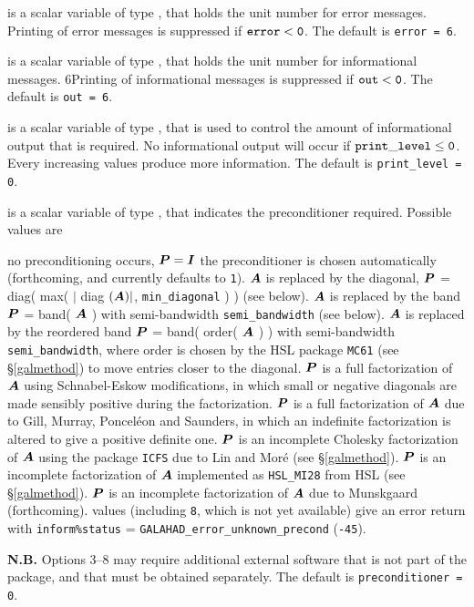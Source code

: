 \documentclass{galahad}
\begin{document}
\begin{description}

 is a scalar variable of type \integer, that holds the
unit number for error messages.
Printing of error messages is suppressed if ${\tt error} < {\tt 0}$.
The default is {\tt error = 6}.

 is a scalar variable of type \integer, that holds the
unit number for informational messages.
6Printing of informational messages is suppressed if ${\tt out} < {\tt 0}$.
The default is {\tt out = 6}.

 is a scalar variable of type \integer,
that is used
to control the amount of informational output that is required. No
informational output will occur if ${\tt print\_level} \leq {\tt 0}$. 
Every increasing values produce more information.
The default is {\tt print\_level = 0}.

 is a scalar variable of type \integer, that 
indicates the preconditioner required. Possible values are
\begin{description}
 no preconditioning occurs, ${\bm{P}} = {\bm{I}}$
  the preconditioner is chosen automatically (forthcoming,
         and currently defaults to {\tt 1}).
  ${\bm{A}}$ is replaced by the diagonal, 
         ${\bm{P}}$ = diag( max( $|$ diag $({\bm{A}})|$, {\tt min\_diagonal} ) ) (see below).
  ${\bm{A}}$ is replaced by the band 
         ${\bm{P}}$ = band( ${\bm{A}}$ ) with semi-bandwidth {\tt semi\_bandwidth}
         (see below).
  ${\bm{A}}$ is replaced by the reordered band 
         ${\bm{P}}$ = band( order( ${\bm{A}}$ ) ) with semi-bandwidth 
         {\tt semi\_bandwidth}, where order is chosen by the HSL package
         {\tt MC61} (see \S\ref{galmethod}) to move entries closer to 
         the diagonal.
  ${\bm{P}}$ is a full factorization of ${\bm{A}}$ using Schnabel-Eskow 
         modifications, in which small or negative diagonals are
         made sensibly positive during the factorization.
  ${\bm{P}}$ is a full factorization of ${\bm{A}}$  due to Gill, Murray, 
         Poncel\'{e}on and Saunders, in which an indefinite factorization 
         is altered to give a positive definite one.
  ${\bm{P}}$ is an incomplete Cholesky factorization of ${\bm{A}}$ using the 
         package {\tt ICFS} due to Lin and Mor\'{e} (see \S\ref{galmethod}).
  ${\bm{P}}$ is an incomplete factorization of ${\bm{A}}$ implemented 
         as {\tt HSL\_MI28} from HSL (see \S\ref{galmethod}).
  ${\bm{P}}$ is an incomplete factorization of ${\bm{A}}$ due 
         to Munskgaard (forthcoming).
 values (including {\tt 8}, which is not yet available) give
         an error return with {\tt inform\%status} =
         {\tt GALAHAD\_error\_unknown\_precond} ({\tt -45}).
\end{description}
{\bf N.B.} Options 3--8 may require additional external software that 
is not part of the package, and that must be obtained separately.
The default is {\tt preconditioner = 0}.


\end{description}
\end{document}
